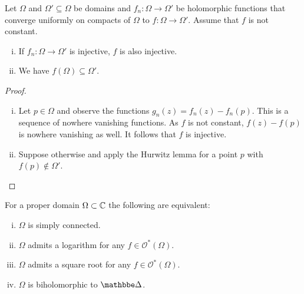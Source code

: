 \begin{izrek}[Hurwitz]
Let $\Omega$ and $\Omega' \subseteq \Omega$ be domains and
$f_n \colon \Omega \to \Omega'$ be holomorphic functions that
converge uniformly on compacts of $\Omega$ to
$f \colon \Omega \to \Omega'$. Assume that $f$ is not constant.

\begin{enumerate}[i)]
\item If $f_n \colon \Omega \to \Omega'$ is injective, $f$ is also
injective.
\item We have $f(\Omega) \subseteq \Omega'$.
\end{enumerate}
\end{izrek}

\begin{proof}
\phantom{a}
\begin{enumerate}[i)]
\item Let $p \in \Omega$ and observe the functions
$g_n(z) = f_n(z) - f_n(p)$. This is a sequence of nowhere vanishing
functions. As $f$ is not constant, $f(z) - f(p)$ is nowhere
vanishing as well. It follows that $f$ is injective.
\item Suppose otherwise and apply the Hurwitz lemma for a point
$p$ with $f(p) \not \in \Omega'$. \qedhere
\end{enumerate}
\end{proof}

\begin{izrek}
For a proper domain $\Omega \subset \mathbb{C}$ the following are
equivalent:

\begin{enumerate}[i)]
\item $\Omega$ is simply connected.
\item $\Omega$ admits a logarithm for any
$f \in \mathcal{O}^*(\Omega)$.
\item $\Omega$ admits a square root for any
$f \in \mathcal{O}^*(\Omega)$.
\item $\Omega$ is biholomorphic to $\dsk$.
\end{enumerate}
\end{izrek}

